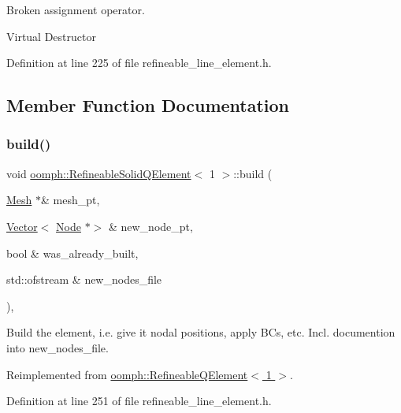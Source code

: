 Broken assignment operator. 

Virtual Destructor 

Definition at line 225 of file refineable\+\_\+line\+\_\+element.\+h.



\subsection{Member Function Documentation}
\mbox{\label{classoomph_1_1RefineableSolidQElement_3_011_01_4_a6b534dd58082904153161cba4034b62f}} 
\subsubsection{\texorpdfstring{build()}{build()}}
{\footnotesize\ttfamily void \hyperlink{classoomph_1_1RefineableSolidQElement}{oomph\+::\+Refineable\+Solid\+Q\+Element}$<$ 1 $>$\+::build (\begin{DoxyParamCaption}\item[{\hyperlink{classoomph_1_1Mesh}{Mesh} $\ast$\&}]{mesh\+\_\+pt,  }\item[{\hyperlink{classoomph_1_1Vector}{Vector}$<$ \hyperlink{classoomph_1_1Node}{Node} $\ast$$>$ \&}]{new\+\_\+node\+\_\+pt,  }\item[{bool \&}]{was\+\_\+already\+\_\+built,  }\item[{std\+::ofstream \&}]{new\+\_\+nodes\+\_\+file }\end{DoxyParamCaption})\hspace{0.3cm}{\ttfamily [inline]}, {\ttfamily [virtual]}}



Build the element, i.\+e. give it nodal positions, apply B\+Cs, etc. Incl. documention into new\+\_\+nodes\+\_\+file. 



Reimplemented from \hyperlink{classoomph_1_1RefineableQElement_3_011_01_4_aa2104bae648ac4b34caecbbb5fb254dc}{oomph\+::\+Refineable\+Q\+Element$<$ 1 $>$}.



Definition at line 251 of file refineable\+\_\+line\+\_\+element.\+h.

